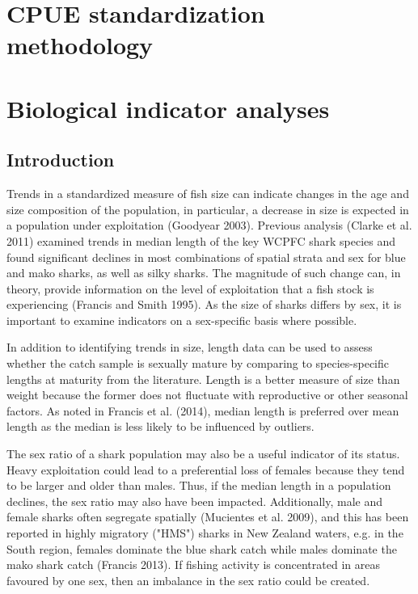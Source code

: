 \documentclass[12pt]{SCreport}
\begin{document}

\section{CPUE standardization methodology}
      
     
      
\section{Biological indicator analyses}
      \subsection{Introduction}
Trends in a standardized measure of fish size can indicate changes in the age and size composition of the population, in particular, a decrease in size is expected in a population under exploitation (Goodyear 2003).  Previous analysis (Clarke et al. 2011) examined trends in median length of the key WCPFC shark species and found significant declines in most combinations of spatial strata and sex for blue and mako sharks, as well as silky sharks.  The magnitude of such change can, in theory, provide information on the level of exploitation that a fish stock is experiencing (Francis and Smith 1995). As the size of sharks differs by sex, it is important to examine indicators on a sex-specific basis where possible. 

In addition to identifying trends in size, length data can be used to assess whether the catch sample is sexually mature by comparing to species-specific lengths at maturity from the literature.  Length is a better measure of size than weight because the former does not fluctuate with reproductive or other seasonal factors. As noted in Francis et al. (2014), median length is preferred over mean length as the median is less likely to be influenced by outliers. 

The sex ratio of a shark population may also be a useful indicator of its status. Heavy exploitation could lead to a preferential loss of females because they tend to be larger and older than males. Thus, if the median length in a population declines, the sex ratio may also have been impacted. Additionally, male and female sharks often segregate spatially (Mucientes et al. 2009), and this has been reported in
highly migratory ("HMS") sharks in New Zealand waters, e.g. in the South region, females dominate the blue shark catch while males dominate the mako shark catch (Francis 2013). If fishing activity is concentrated in areas favoured by one sex, then an imbalance in the sex ratio could be created.
\end{document}
